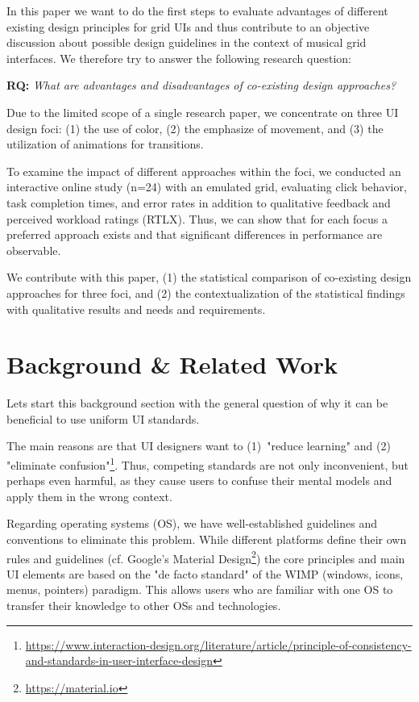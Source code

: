 \documentclass[sigconf]{nimeart}
\begin{document}
In this paper we want to do the first steps to evaluate advantages of different existing design principles for grid UIs and thus contribute to an objective discussion about possible design guidelines in the context of musical grid interfaces. We therefore try to answer the following research question:

\textbf{RQ:} \emph{What are advantages and disadvantages of co-existing design approaches?}

Due to the limited scope of a single research paper, we concentrate on three UI design foci: (1) the use of color, (2) the emphasize of movement, and (3) the utilization of animations for transitions.

To examine the impact of different approaches within the foci, we conducted an interactive online study (n=24) with an emulated grid, evaluating click behavior, task completion times, and error rates in addition to qualitative feedback and perceived workload ratings (RTLX). Thus, we can show that for each focus a preferred approach exists and that significant differences in performance are observable.

We contribute with this paper, (1) the statistical comparison of co-existing design approaches for three foci, and (2) the contextualization of the statistical findings with qualitative results and needs and requirements.

\section{Background \& Related Work}\label{background-related-work}

Let\textquotesingle s start this background section with the general question of why it can be beneficial to use uniform UI standards.

The main reasons are that UI designers want to (1)~"reduce learning" and (2) "eliminate confusion"\footnote{\href{}{https://www.interaction-design.org/literature/article/principle-of-consistency-and-standards-in-user-interface-design}}. Thus, competing standards are not only inconvenient, but perhaps even harmful, as they cause users to confuse their mental models and apply them in the wrong context.

Regarding operating systems (OS), we have well-established guidelines and conventions to eliminate this problem. While different platforms define their own rules and guidelines (cf. Google's Material Design\footnote{\href{}{https://material.io}}) the core principles and main UI elements are based on the "de facto standard" \cite{10.1145U002F253671.253708} of the WIMP (windows, icons, menus, pointers) paradigm. This allows users who are familiar with one OS to transfer their knowledge to other OSs and technologies.
\end{document}
